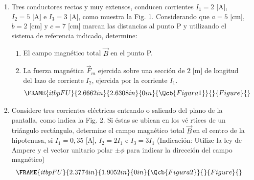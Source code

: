 \documentclass[onecolumn]{article}
\begin{document}
\begin{enumerate}
\item Tres conductores rectos y muy extensos, conducen corrientes $I_{1}=2$
[A], $I_{2}=5$ [A] e $I_{3}=3$ [A], como muestra la Fig. 1. Considerando que 
$a=5$ [cm], $b=2$ [cm] y $c=7$ [cm] marcan las distancias al punto P y
utilizando el sistema de referencia indicado, determine:

\begin{enumerate}
\item El campo magn\'{e}tico total $\vec{B}$ en el punto P.

\item La fuerza magn\'{e}tica $\vec{F}_{m}$ ejercida sobre una secci\'{o}n
de $2$ [m] de longitud del lazo de corriente $I_{2}$, ejercida por la
corriente $I_{1}$.%
\begin{equation*}
\FRAME{itbpFU}{2.6662in}{2.6308in}{0in}{\Qcb{Figura 1}}{}{Figure}{\special%
{language "Scientific Word";type "GRAPHIC";maintain-aspect-ratio
TRUE;display "USEDEF";valid_file "T";width 2.6662in;height 2.6308in;depth
0in;original-width 8.3169in;original-height 8.2071in;cropleft "0";croptop
"1";cropright "1";cropbottom "0";tempfilename
'THI77900.bmp';tempfile-properties "XPR";}}
\end{equation*}
\end{enumerate}

\item Considere tres corrientes el\'{e}ctricas entrando o saliendo del plano
de la pantalla, como indica la Fig. 2. Si \'{e}stas se ubican en los v\'{e}%
rtices de un tri\'{a}ngulo rect\'{a}ngulo, determine el campo magn\'{e}tico
total $\vec{B}\,$en el centro de la hipotenusa, si $I_{1}=0,35$ [A], $%
I_{2}=2I_{1}$ e $I_{3}=3I_{1}$ (Indicaci\'{o}n: Utilize la ley de Ampere y
el vector unitario polar $\pm \phi $ para indicar la direcci\'{o}n del campo
magn\'{e}tico)%
\begin{equation*}
\FRAME{itbpFU}{2.3774in}{1.9052in}{0in}{\Qcb{Figura 2}}{}{Figure}{\special%
{language "Scientific Word";type "GRAPHIC";maintain-aspect-ratio
TRUE;display "USEDEF";valid_file "T";width 2.3774in;height 1.9052in;depth
0in;original-width 7.8784in;original-height 6.3045in;cropleft "0";croptop
"1";cropright "1";cropbottom "0";tempfilename
'THI7RK02.bmp';tempfile-properties "XPR";}}
\end{equation*}%
\pagebreak 


\end{enumerate}
\end{document}
